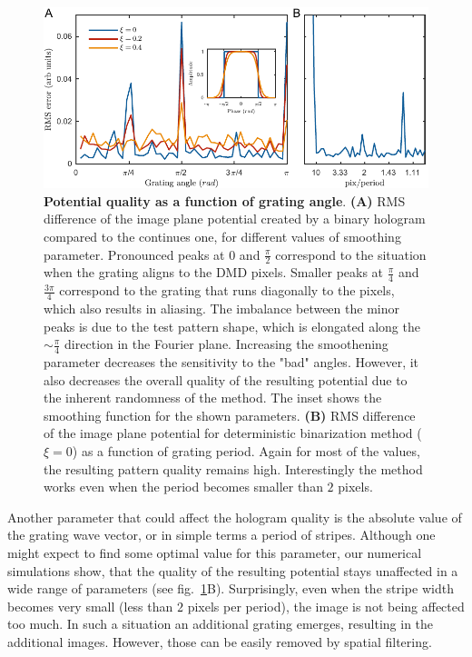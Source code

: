 \begin{figure}[t]
	\centering
	\includegraphics[scale=1]{figures/DMD_K_rotation_v3.pdf}
	\caption{{\bf Potential quality as a function of grating angle}. {\bf (A)} RMS difference of the image plane potential created by a binary hologram compared to the continues one, for different values of smoothing parameter. Pronounced peaks at $0$ and $\frac{\pi}{2}$ correspond to the situation when the grating aligns to the DMD pixels. Smaller peaks at $\frac{\pi}{4}$ and $\frac{3\pi}{4}$ correspond to the grating that runs diagonally to the pixels, which also results in aliasing. The imbalance between the minor peaks is due to the test pattern shape, which is elongated along the $\sim \frac{\pi}{4}$ direction in the Fourier plane. Increasing the smoothening parameter decreases the sensitivity to the "bad" angles. However, it also decreases the overall quality of the resulting potential due to the inherent randomness of the method. The inset shows the smoothing function for the shown parameters. {\bf (B)} RMS difference of the image plane potential for deterministic binarization method ($\xi = 0$) as a function of grating period. Again for most of the values, the resulting pattern quality remains high. Interestingly the method works even when the period becomes smaller than $2$ pixels.}
	\label{fig:DMD_K_rotation}
\end{figure}

Another parameter that could affect the hologram quality is the absolute value of the grating wave vector, or in simple terms a period of stripes. Although one might expect to find some optimal value for this parameter, our numerical simulations show, that the quality of the resulting potential stays unaffected in a wide range of parameters (see fig.~\ref{fig:DMD_K_rotation}B). Surprisingly, even when the stripe width becomes very small (less than $2$ pixels per period),  the image is not being affected too much. In such a situation an additional grating emerges, resulting in the additional images. However, those can be easily removed by spatial filtering.

